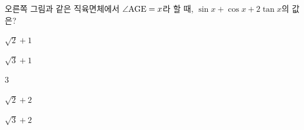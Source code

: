 \noindent\begin{minipage}[t]{0.58\linewidth}\vspace{0pt}\raggedright 오른쪽 그림과 같은 직육면체에서 $\angle\mathrm{AGE}=x$라 할 때, $\sin x+\cos x+2\tan x$의 값은?\end{minipage}\hfill\begin{minipage}[t]{0.4\linewidth}\vspace{0pt}\centering \resizebox{\ifdim\width>\linewidth\linewidth\else\width\fi}{!}{}\end{minipage}\par
\begin{choicesii}{\rule[-3ex]{0pt}{8ex}$\sqrt{2}+1$}{\rule[-3ex]{0pt}{8ex}$\sqrt{3}+1$}{\rule[-3ex]{0pt}{8ex}$3$}{\rule[-3ex]{0pt}{8ex}$\sqrt{2}+2$}{\rule[-3ex]{0pt}{8ex}$\sqrt{3}+2$}\end{choicesii}
